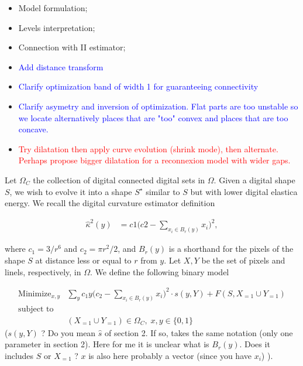 \documentclass[runningheads]{llncs}
\newcommand{\todo}[1]{{\textcolor{blue}{#1}}}
\newcommand{\test}[1]{{\textcolor{red}{#1}}}
\newcommand{\jaco}[1]{{\textcolor{green!50!black}{#1}}}
\begin{document}
\begin{itemize}
	\item{Model formulation;}
	\item{Levels interpretation;}
    \item{Connection with II estimator;}	
    \item{\todo{Add distance transform}}
    \item{\todo{Clarify optimization band of width 1 for guaranteeing connectivity}}
    \item{\todo{Clarify asymetry and inversion of optimization. Flat parts are too unstable so we locate alternatively places that are "too" convex and places that are too concave.}}
    \item{\test{Try dilatation then apply curve evolution (shrink mode), then alternate. Perhaps propose bigger dilatation for a reconnexion model with wider gaps.}}
\end{itemize}

\hrulefill

	Let $\Omega_C$ the collection of digital connected digital sets in $\Omega$. Given a digital shape $S$, we wish to evolve it into a shape $S^\star$ similar to $S$ but with lower digital elastica energy. We recall the digital curvature estimator definition
	
\begin{align}
	\hat{\kappa}^2(y) &= c1\Big( c2 - \sum_{x_i \in B_r(y)}{x_i} \Big)^2, 
	\label{eq:curvature-estimator-pixels}
\end{align}

where $c_1=3/r^6$ and $c_2=\pi r^2/2$, \jaco{and $B_r(y)$ is a shorthand for the pixels of the shape $S$ at distance less or equal to $r$ from $y$}. Let $X,Y$ be the set of pixels and linels, respectively, in $\Omega$. We define the following binary model
		
\begin{align}
\text{Minimize}_{x,y} & \sum_{y}{c_1y \Big(c_2 - \sum_{x_i \in B_r(y)}{x_i}\Big)^2	 } \cdot s(y,Y) \nonumber + F(S,X_{=1} \cup Y_{=1}) \nonumber \\
\text{subject to} & \nonumber \\
& (X_{=1} \cup Y_{=1}) \in \Omega_C, \; x,y \in \{0,1\}
\label{eq:general-binary-formulation}
\end{align}
\jaco{($s(y,Y)$ ? Do you mean $\hat{s}$ of section 2. If so, takes the same notation (only one parameter in section 2). Here for me it is unclear what is $B_r(y)$. Does it includes $S$ or $X_{=1}$ ? $x$ is also here probably a vector (since you have $x_i$) ).}
\end{document}
